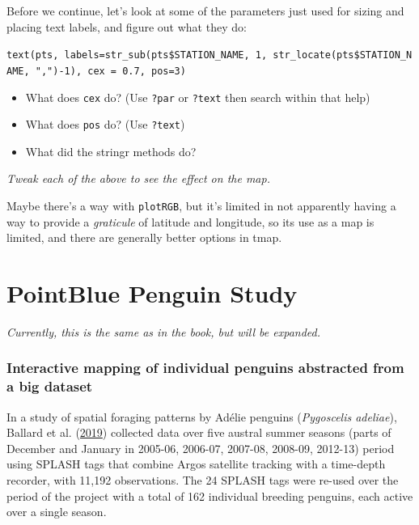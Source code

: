 \documentclass[
]{book}
\providecommand{\tightlist}{%
  \setlength{\itemsep}{0pt}\setlength{\parskip}{0pt}}
\begin{document}
Before we continue, let's look at some of the parameters just used for sizing and placing text labels, and figure out what they do:

\texttt{text(pts,\ labels=str\_sub(pts\$STATION\_NAME,\ 1,\ str\_locate(pts\$STATION\_NAME,\ ",")-1),\ cex\ =\ 0.7,\ pos=3)}

\begin{itemize}
\tightlist
\item
  What does \texttt{cex} do? (Use \texttt{?par} or \texttt{?text} then search within that help)
\item
  What does \texttt{pos} do? (Use \texttt{?text})
\item
  What did the stringr methods do?
\end{itemize}

\emph{Tweak each of the above to see the effect on the map.}

Maybe there's a way with \texttt{plotRGB}, but it's limited in not apparently having a way to provide a \emph{graticule} of latitude and longitude, so its use as a map is limited, and there are generally better options in tmap.

\hypertarget{pointblue-penguin-study}{%
\chapter{PointBlue Penguin Study}\label{pointblue-penguin-study}}

\emph{Currently, this is the same as in the book, but will be expanded.}

\hypertarget{interactive-mapping-of-individual-penguins-abstracted-from-a-big-dataset}{%
\subsection{Interactive mapping of individual penguins abstracted from a big dataset}\label{interactive-mapping-of-individual-penguins-abstracted-from-a-big-dataset}}

In a study of spatial foraging patterns by Adélie penguins (\emph{Pygoscelis adeliae}), Ballard et al. (\protect\hyperlink{ref-Ballard2019}{2019}) collected data over five austral summer seasons (parts of December and January in 2005-06, 2006-07, 2007-08, 2008-09, 2012-13) period using SPLASH tags that combine Argos satellite tracking with a time-depth recorder, with 11,192 observations. The 24 SPLASH tags were re-used over the period of the project with a total of 162 individual breeding penguins, each active over a single season.
\end{document}
